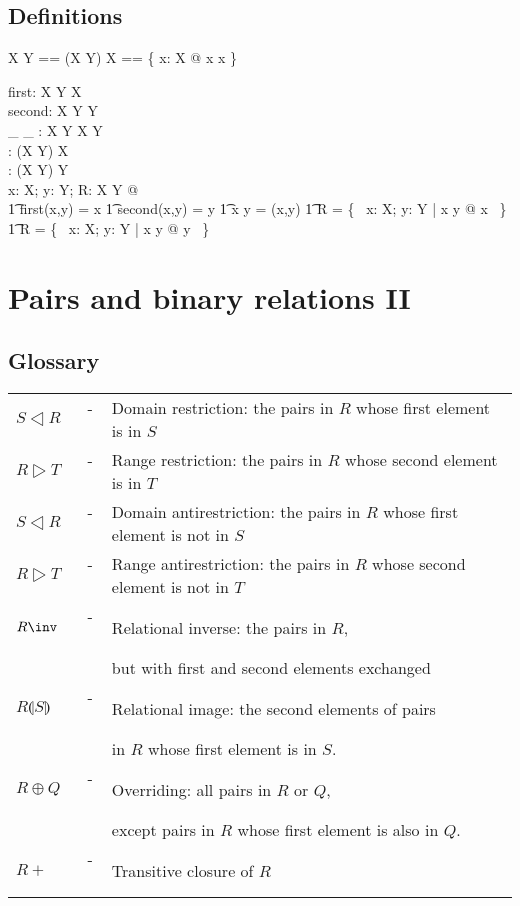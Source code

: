 \subsection*{Definitions}

\begin{zed} 
	X \rel Y == \power (X \cross Y)
\also
	\id X == \{ x: X @ x \mapsto x \}
\end{zed}

\begin{gendef}[X,Y]
	first: X \cross Y \fun X \\
	second: X \cross Y \fun Y \\
	\_ \mapsto \_ : X \cross Y \fun X \cross Y \\
	\dom: (X \rel Y) \fun \power X \\
	\ran: (X \rel Y) \fun \power Y \\
\where
	\forall x: X; y: Y; R: X \rel Y @ \\
\also
\t1	first(x,y) = x \land
\also
\t1	second(x,y) = y \land
\also
\t1	x \mapsto y = (x,y) \land
\also
\t1	\dom R = \{~ x: X; y: Y | x  y @ x ~\} \land	
\also
\t1	\ran R = \{~ x: X; y: Y | x  y @ y ~\}
\also
\end{gendef}

\newpage

\section*{Pairs and binary relations II}

\subsection*{Glossary}

\begin{tabular}{l c l}
$S \dres R$ & ~-~ & Domain restriction: the pairs in $R$ whose first element is in $S$ \\
$R \rres T$ & ~-~ & Range restriction: the pairs in $R$ whose second element is in $T$ \\
$S \dres R$ & ~-~ & Domain antirestriction: the pairs in $R$ whose first element is not in $S$ \\
$R \rres T$ & ~-~ & Range antirestriction: the pairs in $R$ whose second element is not in $T$ \\
$R \inv$ & ~-~ & Relational inverse: the  pairs in $R$, \\
	&  & but with first and second elements exchanged \\
$R \limg S \rimg$ & ~-~ & Relational image: the second elements of pairs \\
		&  & in $R$ whose first element is in $S$. \\
$R \oplus Q$ & ~-~ & Overriding: all pairs in $R$ or $Q$, \\
	& & except pairs in $R$ whose first element is also in $Q$. \\
$R \plus$ & ~-~ & Transitive closure of $R$ \\
\end{tabular}

